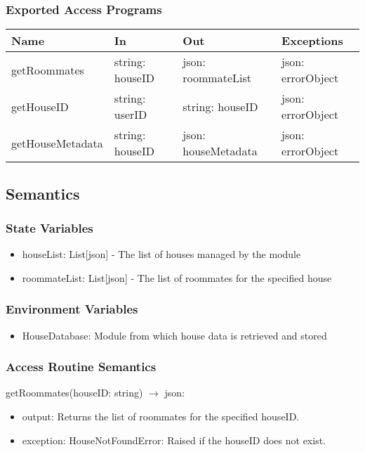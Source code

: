 \documentclass[12pt, titlepage]{article}
\begin{document}
\subsubsection{Exported Access Programs}

\begin{center}
\begin{tabular}{p{3cm} p{4cm} p{5cm} p{3.5cm}}
\hline
\textbf{Name} & \textbf{In} & \textbf{Out} & \textbf{Exceptions} \\
\hline
getRoommates & string: houseID & json: roommateList & json: errorObject \\
getHouseID & string: userID & string: houseID & json: errorObject \\
getHouseMetadata & string: houseID & json: houseMetadata & json: errorObject \\
\hline
\end{tabular}
\end{center}

\subsection{Semantics}

\subsubsection{State Variables}
\begin{itemize}
  \item houseList: List[json] - The list of houses managed by the module
  \item roommateList: List[json] - The list of roommates for the specified house
\end{itemize}

\subsubsection{Environment Variables}

\begin{itemize}
  \item HouseDatabase: Module from which house data is retrieved and stored
\end{itemize}

\subsubsection{Access Routine Semantics}

\noindent getRoommates(houseID: string) $\rightarrow$ json:
\begin{itemize}
\item output: Returns the list of roommates for the specified houseID.
\item exception: HouseNotFoundError: Raised if the houseID does not exist.
\end{itemize}
\end{document}
